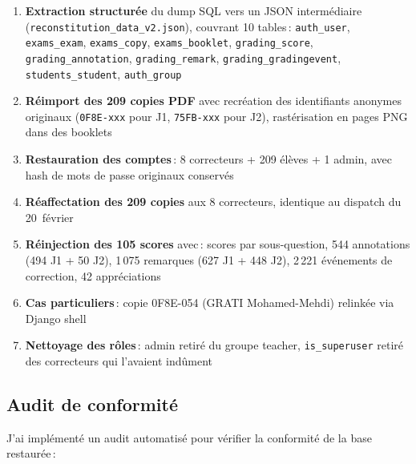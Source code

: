 \documentclass[11pt,a4paper]{article}
\begin{document}
\begin{enumerate}
	\item \textbf{Extraction structur\'{e}e} du dump SQL vers un JSON interm\'{e}diaire (\texttt{reconstitution\_data\_v2.json}), couvrant 10 tables\,: \texttt{auth\_user}, \texttt{exams\_exam}, \texttt{exams\_copy}, \texttt{exams\_booklet}, \texttt{grading\_score}, \texttt{grading\_annotation}, \texttt{grading\_remark}, \texttt{grading\_gradingevent}, \texttt{students\_student}, \texttt{auth\_group}
	\item \textbf{R\'{e}import des 209 copies PDF} avec recr\'{e}ation des identifiants anonymes originaux (\texttt{0F8E-xxx} pour J1, \texttt{75FB-xxx} pour J2), rast\'{e}risation en pages PNG dans des booklets
	\item \textbf{Restauration des comptes}\,: 8 correcteurs + 209 \'{e}l\`{e}ves + 1 admin, avec hash de mots de passe originaux conserv\'{e}s
	\item \textbf{R\'{e}affectation des 209 copies} aux 8 correcteurs, identique au dispatch du 20~f\'{e}vrier
	\item \textbf{R\'{e}injection des 105 scores} avec\,: scores par sous-question, 544 annotations (494 J1 + 50 J2), 1\,075 remarques (627 J1 + 448 J2), 2\,221 \'{e}v\'{e}nements de correction, 42 appr\'{e}ciations
	\item \textbf{Cas particuliers}\,: copie 0F8E-054 (GRATI Mohamed-Mehdi) relink\'{e}e via Django shell
	\item \textbf{Nettoyage des r\^{o}les}\,: admin retir\'{e} du groupe teacher, \texttt{is\_superuser} retir\'{e} des correcteurs qui l'avaient ind\^{u}ment
\end{enumerate}

\subsection{Audit de conformit\'{e}}

J'ai impl\'{e}ment\'{e} un audit automatis\'{e} pour v\'{e}rifier la conformit\'{e} de la base restaur\'{e}e\,:
\end{document}
